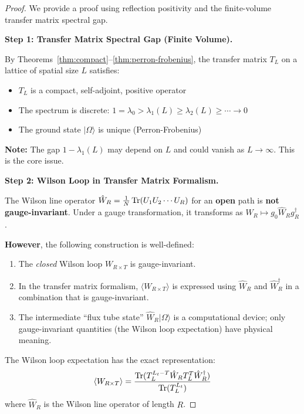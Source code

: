 \begin{proof}
We provide a proof using reflection positivity and the finite-volume transfer 
matrix spectral gap.

\textbf{Step 1: Transfer Matrix Spectral Gap (Finite Volume).}

By Theorems~\ref{thm:compact}--\ref{thm:perron-frobenius}, the transfer matrix $T_L$ 
on a lattice of spatial size $L$ satisfies:
\begin{itemize}
\item $T_L$ is a compact, self-adjoint, positive operator
\item The spectrum is discrete: $1 = \lambda_0 > \lambda_1(L) \geq \lambda_2(L) \geq \cdots \to 0$
\item The ground state $|\Omega\rangle$ is unique (Perron-Frobenius)
\end{itemize}

\textbf{Note:} The gap $1 - \lambda_1(L)$ may depend on $L$ and could 
vanish as $L \to \infty$. This is the core issue.

\textbf{Step 2: Wilson Loop in Transfer Matrix Formalism.}

\begin{tcolorbox}[colback=yellow!5, colframe=yellow!75!black, title=\textbf{Important: Gauge Invariance of Wilson Lines}]
The Wilson line operator $\hat{W}_R = \frac{1}{N}\operatorname{Tr}(U_1 U_2 \cdots U_R)$ for 
an \textbf{open} path is \textbf{not gauge-invariant}. Under a gauge transformation, 
it transforms as $\hat{W}_R \mapsto g_0 \hat{W}_R g_R^\dagger$.

\textbf{However}, the following construction is well-defined:
\begin{enumerate}
\item The \emph{closed} Wilson loop $W_{R \times T}$ is gauge-invariant.
\item In the transfer matrix formalism, $\langle W_{R \times T} \rangle$ is expressed 
using $\hat{W}_R$ and $\hat{W}_R^\dagger$ in a combination that is gauge-invariant.
\item The intermediate ``flux tube state'' $\hat{W}_R |\Omega\rangle$ is a 
computational device; only gauge-invariant quantities (the Wilson loop expectation) 
have physical meaning.
\end{enumerate}
\end{tcolorbox}

The Wilson loop expectation has the exact representation:
\[
\langle W_{R \times T} \rangle = \frac{\operatorname{Tr}(T_L^{L_t - T} \hat{W}_R T_L^T \hat{W}_R^\dagger)}{\operatorname{Tr}(T_L^{L_t})}
\]
where $\hat{W}_R$ is the Wilson line operator of length $R$.


\end{proof}
